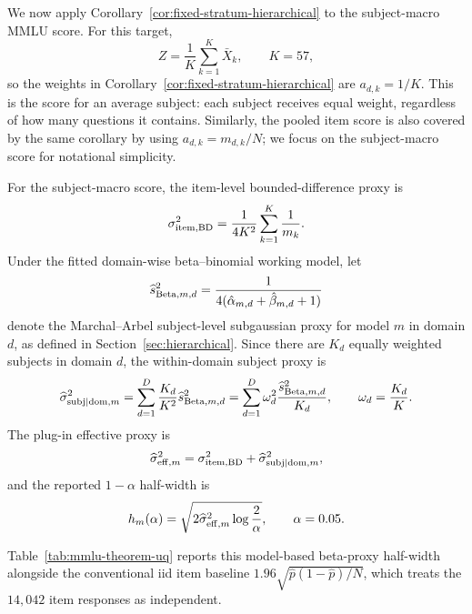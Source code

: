 \documentclass[11pt]{article}
\theoremstyle{definition}
\theoremstyle{remark}
\begin{document}
We now apply Corollary~\ref{cor:fixed-stratum-hierarchical} to the subject-macro MMLU score.  For this target,
\[
    Z=\frac1K\sum_{k=1}^{K}\bar X_k,
    \qquad K=57,
\]
so the weights in Corollary~\ref{cor:fixed-stratum-hierarchical} are \(a_{d,k}=1/K\).  This is the score for an average subject: each subject receives equal weight, regardless of how many questions it contains. Similarly, the pooled item score is also covered by the same corollary by using \(a_{d,k}=m_{d,k}/N\); we focus on the subject-macro score for notational simplicity.

For the subject-macro score, the item-level bounded-difference proxy is
\[
    \sigma_{\rm item,BD}^2
    =
    \frac{1}{4K^2}\sum_{k=1}^K\frac1{m_k}.
\]
Under the fitted domain-wise beta--binomial working model, let
\[
    \widehat s_{{\rm Beta},m,d}^2
    =
    \frac{1}{4(\hat\alpha_{m,d}+\hat\beta_{m,d}+1)}
\]
denote the Marchal--Arbel subject-level subgaussian proxy for model \(m\) in domain \(d\), as defined in Section~\ref{sec:hierarchical}.  Since there are \(K_d\) equally weighted subjects in domain \(d\), the within-domain subject proxy is
\[
    \widehat\sigma_{{\rm subj}\mid{\rm dom},m}^2
    =
    \sum_{d=1}^D
    \frac{K_d}{K^2}\widehat s_{{\rm Beta},m,d}^2
    =
    \sum_{d=1}^D
    \omega_d^2\frac{\widehat s_{{\rm Beta},m,d}^2}{K_d},
    \qquad
    \omega_d=\frac{K_d}{K}.
\]
The plug-in effective proxy is
\[
    \widehat\sigma_{{\rm eff},m}^2
    =
    \sigma_{\rm item,BD}^2
    +
    \widehat\sigma_{{\rm subj}\mid{\rm dom},m}^2,
\]
and the reported \(1-\alpha\) half-width is
\[
    h_m(\alpha)
    =
    \sqrt{2\widehat\sigma_{{\rm eff},m}^2\log\frac{2}{\alpha}},
    \qquad \alpha=0.05.
\]

Table~\ref{tab:mmlu-theorem-uq} reports this model-based beta-proxy half-width alongside the conventional iid item baseline \(1.96\sqrt{\hat p(1-\hat p)/N}\), which treats the \(14{,}042\) item responses as independent.
\end{document}
